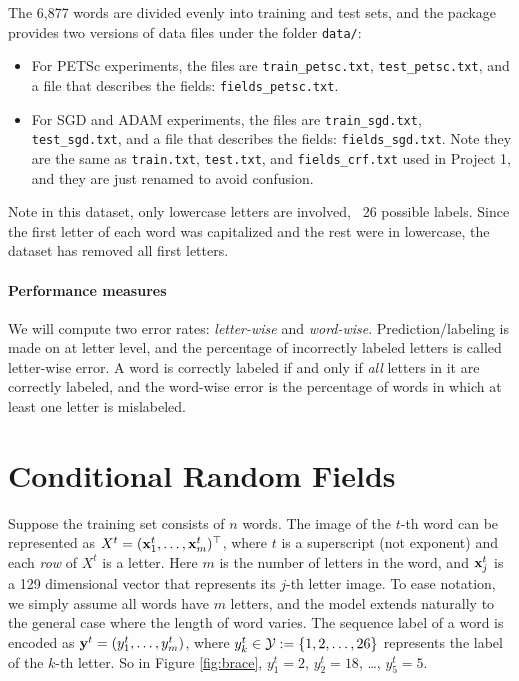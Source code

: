 \documentclass[11pt]{report}
\begin{document}
\begin{center}
\end{center}

The 6,877 words are divided evenly into training and test sets,
and the package provides two versions of data files under the folder \verb#data/#:
\begin{itemize}
	\item For PETSc experiments, the files are \verb#train_petsc.txt#, \verb#test_petsc.txt#, and a file that describes the fields: \verb#fields_petsc.txt#.
	\item For SGD and ADAM experiments, the files are \verb#train_sgd.txt#, \verb#test_sgd.txt#, and a file that describes the fields:  \verb#fields_sgd.txt#.
	Note they are the same as \verb#train.txt#, \verb#test.txt#, and \verb#fields_crf.txt# used in Project 1, and they are just renamed to avoid confusion.
\end{itemize}


Note in this dataset, only lowercase letters are involved, \ie\ 26 possible labels.
Since the first letter of each word was capitalized and the rest were in lowercase,
the dataset has removed all first letters.


\paragraph{Performance measures}
%
We will compute two error rates: \emph{letter-wise} and \emph{word-wise}.
Prediction/labeling is made on at letter level,
and the percentage of incorrectly labeled letters is called letter-wise error.
A word is correctly labeled if and only if \emph{all} letters in it are correctly labeled,
and the word-wise error is the percentage of words in which at least one letter is mislabeled.


\section{Conditional Random Fields}

Suppose the training set consists of $n$ words.
The image of the $t$-th word can be represented as
$X^t = (\mathbf{\boldsymbol{x}}^t_1, \ldots, \mathbf{\boldsymbol{x}}^t_m)^\top$,
where $t$ is a superscript (not exponent) and each \emph{row} of $X^t$ is a letter.
Here $m$ is the number of letters in the word,
and $\mathbf{\boldsymbol{x}}^t_j$ is a 129 dimensional vector that represents its $j$-th letter image.
To ease notation, we simply assume all words have $m$ letters,
and the model extends naturally to the general case where the length of word varies.
The sequence label of a word is encoded as
$\mathbf{\boldsymbol{y}}^t = (y^t_1, \ldots, y^t_m)$,
where $y^t_k \in \mathcal{Y} := \{1, 2, \ldots, 26\}$ represents the label of the $k$-th letter.
So in Figure \ref{fig:brace}, $y^t_1 = 2$, $y^t_2 = 18$, \ldots, $y^t_5 = 5$.
\end{document}

